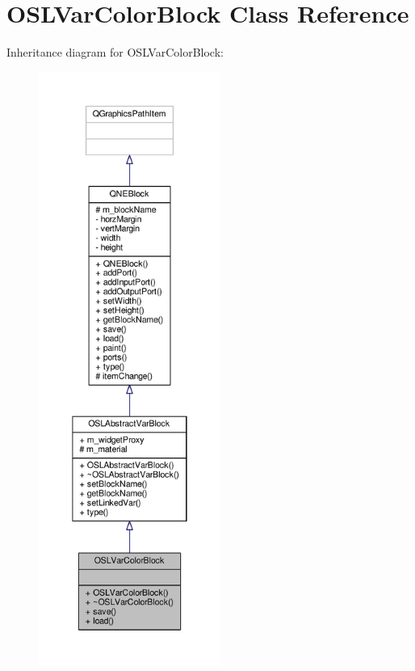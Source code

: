 \hypertarget{class_o_s_l_var_color_block}{\section{O\-S\-L\-Var\-Color\-Block Class Reference}
\label{class_o_s_l_var_color_block}
}


Inheritance diagram for O\-S\-L\-Var\-Color\-Block\-:
\nopagebreak
\begin{figure}[H]
\begin{center}
\leavevmode
\includegraphics[height=550pt]{class_o_s_l_var_color_block__inherit__graph}
\end{center}
\end{figure}


